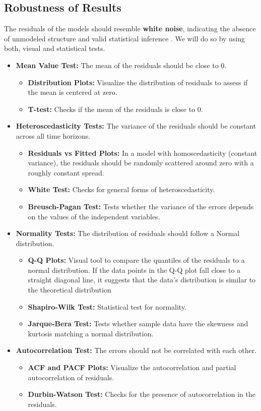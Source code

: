 \documentclass[11pt,english,a4paper,hidelinks]{book}
\begin{document}
\subsection{Robustness of Results}
The residuals of the models should resemble \textbf{white noise}, indicating the absence of unmodeled structure and valid statistical inference \textcite{enders1948applied}. We will do so by using both, visual and statistical tests.
\begin{itemize}
    \item \textbf{Mean Value Test:} The mean of the residuals should be close to 0.
        \begin{itemize}
            \item \textbf{Distribution Plots:} Visualize the distribution of residuals to assess if the mean is centered at zero.
            \item \textbf{T-test:} Checks if the mean of the residuals is close to 0.
        \end{itemize}
    \item \textbf{Heteroscedasticity Tests:} The variance of the residuals should be constant across all time horizons.
        \begin{itemize}
            \item \textbf{Residuals vs Fitted Plots:} In a model with homoscedasticity (constant variance), the residuals should be randomly scattered around zero with a roughly constant spread.
            \item \textbf{White Test:} Checks for general forms of heteroscedasticity.
            \item \textbf{Breusch-Pagan Test:} Tests whether the variance of the errors depends on the values of the independent variables.
        \end{itemize}
    \item \textbf{Normality Tests:} The distribution of residuals should follow a Normal distribution.
        \begin{itemize}
            \item \textbf{Q-Q Plots:} Visual tool to compare the quantiles of the residuals to a normal distribution. If the data points in the Q-Q plot fall close to a straight diagonal line, it suggests that the data's distribution is similar to the theoretical distribution
            \item \textbf{Shapiro-Wilk Test:} Statistical test for normality.
            \item \textbf{Jarque-Bera Test:} Tests whether sample data have the skewness and kurtosis matching a normal distribution.
        \end{itemize}
    \item \textbf{Autocorrelation Test:} The errors should not be correlated with each other.
        \begin{itemize}
            \item \textbf{ACF and PACF Plots:} Visualize the autocorrelation and partial autocorrelation of residuals.
            \item \textbf{Durbin-Watson Test:} Checks for the presence of autocorrelation in the residuals.
        \end{itemize}
\end{itemize}
\end{document}
